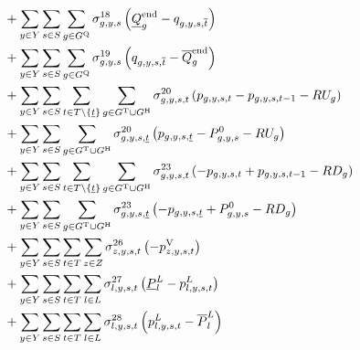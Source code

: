 \documentclass{article}
\begin{document}
\begin{align}
	& + \sum\limits_{\iYear \in \sYears}\sum\limits_{\iScenario \in \sScenarios} \sum\limits_{\iGenerator \in \sStorage} \dMinStorageEnergyIntervalEnd \left(\cStorageUnitEnergyIntervalEndMin - \vStorageUnitEnergy[\iGenerator,\iYear,\iScenario,\iIntervalTerminal]\right)\nonumber\\
	& + \sum\limits_{\iYear \in \sYears}\sum\limits_{\iScenario \in \sScenarios} \sum\limits_{\iGenerator \in \sStorage} \dMaxStorageEnergyIntervalEnd \left(\vStorageUnitEnergy[\iGenerator,\iYear,\iScenario,\iIntervalTerminal] - \cStorageUnitEnergyIntervalEndMax\right)\nonumber\\
	& + \sum\limits_{\iYear \in \sYears}\sum\limits_{\iScenario \in \sScenarios}\sum\limits_{\iInterval \in \sIntervals \setminus \{\iIntervalStart\}} \sum\limits_{\iGenerator \in \sGeneratorsThermal \cup \sGeneratorsHydro} \dRampRateUp \left(\vPower - \vPower[\iGenerator,\iYear,\iScenario,\iInterval-1] - \cRampRateUp\right)\nonumber\\
	& + \sum\limits_{\iYear \in \sYears}\sum\limits_{\iScenario \in \sScenarios} \sum\limits_{\iGenerator \in \sGeneratorsThermal \cup \sGeneratorsHydro} \dRampRateUp[\iGenerator,\iYear,\iScenario,\iIntervalStart] \left(\vPower[\iGenerator,\iYear,\iScenario,\iIntervalStart] - \cPowerInitial - \cRampRateUp\right)\nonumber\\
	& + \sum\limits_{\iYear \in \sYears}\sum\limits_{\iScenario \in \sScenarios}\sum\limits_{\iInterval \in \sIntervals \setminus \{\iIntervalStart\}} \sum\limits_{\iGenerator \in \sGeneratorsThermal \cup \sGeneratorsHydro} \dRampRateDown \left(- \vPower + \vPower[\iGenerator,\iYear,\iScenario,\iInterval-1] - \cRampRateDown\right)\nonumber\\
	& + \sum\limits_{\iYear \in \sYears}\sum\limits_{\iScenario \in \sScenarios} \sum\limits_{\iGenerator \in \sGeneratorsThermal \cup \sGeneratorsHydro} \dRampRateDown[\iGenerator,\iYear,\iScenario,\iIntervalStart] \left(- \vPower[\iGenerator,\iYear,\iScenario,\iIntervalStart] + \cPowerInitial - \cRampRateDown\right)\nonumber\\
	& + \sum\limits_{\iYear \in \sYears}\sum\limits_{\iScenario \in \sScenarios}\sum\limits_{\iInterval \in \sIntervals} \sum\limits_{\iZone \in \sZones} \dNonNegativeLostLoad \left(- \vLostLoadPower\right)\nonumber\\
	& + \sum\limits_{\iYear \in \sYears}\sum\limits_{\iScenario \in \sScenarios}\sum\limits_{\iInterval \in \sIntervals} \sum\limits_{\iLink \in \sLinks} \dMinPowerFlow \left(\cPowerFlowMin - \vPowerFlow\right)\nonumber\\
	& + \sum\limits_{\iYear \in \sYears}\sum\limits_{\iScenario \in \sScenarios}\sum\limits_{\iInterval \in \sIntervals} \sum\limits_{\iLink \in \sLinks} \dMaxPowerFlow \left(\vPowerFlow - \cPowerFlowMax\right) \\\nonumber
\end{align}
\end{document}

